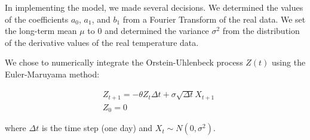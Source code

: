 \documentclass[11pt, letterpaper]{article}
\begin{document}
In implementing the model, we made several decisions.  We determined the values of the coefficients $a_0$, $a_1$, and $b_1$ from a Fourier Transform of the real data.  We set the long-term mean $\mu$ to 0 and determined the variance $\sigma^2$ from the distribution of the derivative values of the real temperature data.

We chose to numerically integrate the Orstein-Uhlenbeck process $Z(t)$ using the Euler-Maruyama method:

\begin{align}
&Z_{t+1} = - \theta Z_t \Delta t + \sigma \sqrt{\Delta t} X_{t+1} \\
&Z_0 = 0
\end{align}

where $\Delta t$ is the time step (one day) and $X_t \sim N(0, \sigma^2)$.
\end{document}
